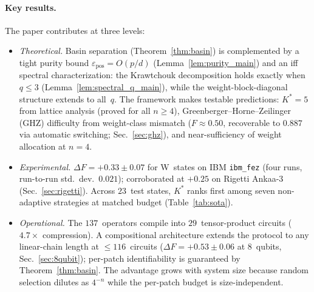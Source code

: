 \documentclass[twocolumn,prx,aps,superscriptaddress,longbibliography,floatfix]{revtex4-2}
\newcommand{\pclaim}[4]{}
\begin{document}
\paragraph{Key results.}
The paper contributes at three levels:
\begin{itemize}
\item[\emph{(i)}] \emph{Theoretical.}
  \pclaim{prose:keyresults:basin}{proved}{*}{thm:basin}%
  Basin separation (Theorem~\ref{thm:basin}) is complemented by
  a tight purity bound $\varepsilon_{\mathrm{pos}} = O(p/d)$
  (Lemma~\ref{lem:purity_main})
  \pclaim{prose:keyresults:iff}{proved}{*}{lem:spectral_q_main}%
  and an iff spectral characterization: the Krawtchouk
  decomposition holds exactly when $q \le 3$
  (Lemma~\ref{lem:spectral_q_main}), while the
  weight-block-diagonal structure extends to all~$q$.
  The framework makes testable predictions:
  $K^* = 5$ from lattice analysis (proved for all $n \ge 4$),
  Greenberger--Horne--Zeilinger (GHZ) difficulty from weight-class mismatch ($F \approx 0.50$,
  recoverable to $0.887$ via automatic switching;
  Sec.~\ref{sec:ghz}), and
  near-sufficiency of weight allocation at $n = 4$.
\item[\emph{(ii)}] \emph{Experimental.}  $\Delta F = +0.33 \pm 0.07$
  for W~states on IBM \texttt{ibm\_fez} (four runs,
  run-to-run std.\ dev.\ $0.021$); corroborated at $+0.25$ on Rigetti
  Ankaa-3 (Sec.~\ref{sec:rigetti}).  Across $23$~test states, $K^*$ ranks first among
  seven non-adaptive strategies at matched budget
  (Table~\ref{tab:sota}).
\item[\emph{(iii)}] \emph{Operational.}  The $137$~operators compile
  into $29$~tensor-product circuits ($4.7\times$ compression).
  A compositional architecture extends the protocol to
  any linear-chain length at $\le 116$~circuits ($\Delta F = +0.53 \pm 0.06$
  at $8$~qubits, Sec.~\ref{sec:8qubit}); per-patch identifiability
  is guaranteed by Theorem~\ref{thm:basin}.
  The advantage grows with system size because random selection
  dilutes as $4^{-n}$ while the per-patch budget is
  size-independent.
\end{itemize}
\end{document}
